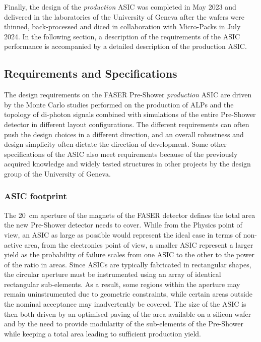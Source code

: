 	Finally, the design of the \textit{production} ASIC was completed in May 2023 and delivered in the laboratories of the University of Geneva after the wafers were thinned, back-processed and diced in collaboration with Micro-Packs in July 2024. In the following section, a description of the requirements of the ASIC performance is accompanied by a detailed description of the production ASIC. 
	
		\subsection{Requirements and Specifications}
		The design requirements on the FASER Pre-Shower \textit{production} ASIC are driven by the Monte Carlo studies performed on the production of ALPs and the topology of di-photon signals combined with simulations of the entire Pre-Shower detector in different layout configurations. The different requirements can often push the design choices in a different direction, and an overall robustness and design simplicity often dictate the direction of development. Some other specifications of the ASIC also meet requirements because of the previously acquired knowledge and widely tested structures in other projects by the design group of the University of Geneva. 
		
		\subsubsection{ASIC footprint}
		The \SI{20}{\centi\meter} aperture of the magnets of the FASER detector defines the total area the new Pre-Shower detector needs to cover. While from the Physics point of view, an ASIC as large as possible would represent the ideal case in terms of non-active area, from the electronics point of view, a smaller ASIC represent a larger yield as the probability of failure scales from one ASIC to the other to the power of the ratio in areas. Since ASICs are typically fabricated in rectangular shapes, the circular aperture must be instrumented using an array of identical rectangular sub-elements. As a result, some regions within the aperture may remain uninstrumented due to geometric constraints, while certain areas outside the nominal acceptance may inadvertently be covered. The size of the ASIC is then both driven by an optimised paving of the area available on a silicon wafer and by the need to provide modularity of the sub-elements of the Pre-Shower while keeping a total area leading to sufficient production yield. 
		
